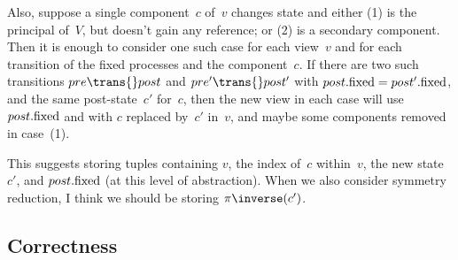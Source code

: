 

\begin{improve}
Also, suppose a single component~$c$ of~$v$ changes state and either (1) is
the principal of~$V$, but doesn't gain any reference; or (2) is a secondary
component.  Then it is enough to consider one such case for each view~$v$ and
for each transition of the fixed processes and the component~$c$.  If there
are two such transitions $pre \trans{} post$ and $pre' \trans{} post'$ with
$post.\mathrm{fixed} = post'.\mathrm{fixed}$, and the same post-state~$c'$ for~$c$, then the
new view in each case will use $post.\mathrm{fixed}$ and with $c$ replaced by~$c'$
in~$v$, and maybe some components removed in case~(1).

This suggests storing tuples containing $v$, the index of~$c$ within~$v$, the
new state~$c'$, and $post.\mathrm{fixed}$ (at this level of abstraction).  When we
also consider symmetry reduction, I think we should be storing
$\pi\inverse(c')$. 

\end{improve}



\subsection{Correctness}
\label{sec:views-correctness}


